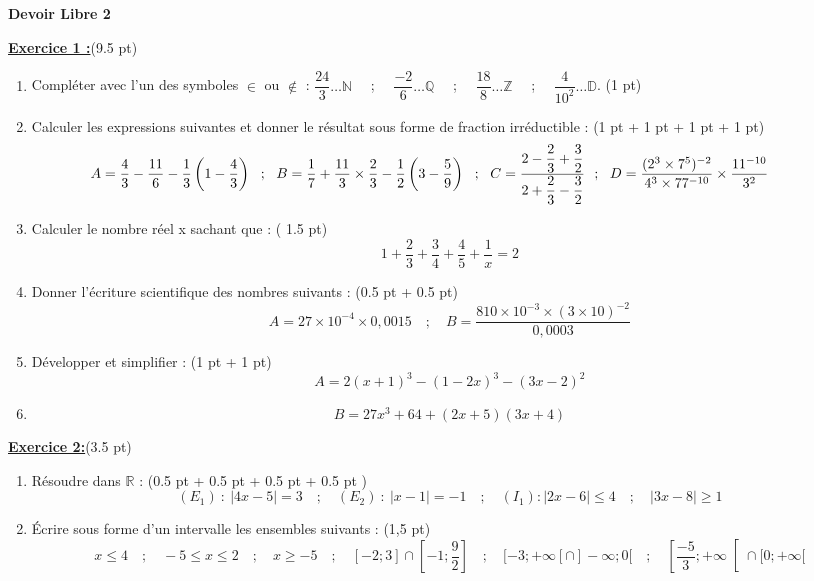 \documentclass[12pt,a4paper]{article}
\begin{document}
\pagestyle{fancy}
\fancyhf{} %
\fancyfoot[C]{\thepage} %


\begin{center}
    \textbf{\Large  Devoir Libre 2}
\end{center}

\underline{\large\textbf{Exercice 1 :}}(9.5 pt)
\begin{enumerate}
   \item Compléter avec l'un des symboles $\in$ ou $\not\in$ : $\dfrac{24}{3}\dots \mathbb{N}$ \ \ ; \ \ $\dfrac{-2}{6}\dots \mathbb{Q}$ \ \ ; \ \ $\dfrac{18}{8}\dots \mathbb{Z}$ \ \ ; \ \ $\dfrac{4}{10^2}\dots \mathbb{D}$. (1 pt)
   \item Calculer les expressions suivantes et donner le résultat sous forme de fraction irréductible : (1 pt + 1 pt + 1 pt + 1 pt)
   $$\hspace{-10mm} A = \dfrac{4}{3} - \dfrac{11}{6} - \dfrac{1}{3}\left(1 - \dfrac{4}{3}\right) \ \ ; \ \ B = \dfrac{1}{7} + \dfrac{11}{3}\times\dfrac{2}{3} - \dfrac{1}{2}\left(3 - \dfrac{5}{9} \right) \ \ ; \ \ C = \dfrac{2 - \dfrac{2}{3} + \dfrac{3}{2}}{2 + \dfrac{2}{3} - \dfrac{3}{2}}\ \ ; \ \ D = \dfrac{(2^3\times 7^5)^{-2}}{4^3\times 77^{-10}}\times\dfrac{11^{-10}}{3^2}$$
   \item Calculer le nombre réel x sachant que : ( 1.5 pt)
   $$1 + \dfrac{2}{3} + \dfrac{3}{4} + \dfrac{4}{5} + \dfrac{1}{x} = 2$$
   \item Donner l’écriture scientifique des nombres suivants : (0.5 pt + 0.5 pt)
   $$A = 27\times 10^{-4}\times 0,0015 \quad ; \quad B = \dfrac{810\times 10^{-3} \times (3\times 10)^{-2}}{0,0003}$$
   \item Développer et simplifier : (1 pt + 1 pt)
   $$A = 2(x + 1)^3 - (1 - 2x)^3 - (3x - 2)^2$$
   \item $$B = 27x^3 + 64 + (2x + 5)(3x + 4)$$
   
\end{enumerate}

\underline{\large\textbf{Exercice  2:}}(3.5 pt)
\begin{enumerate}
	\item Résoudre dans $\mathbb{R}$ : (0.5 pt + 0.5 pt + 0.5 pt  + 0.5 pt )
		$$(E_1) \ : \ |4x - 5| = 3 \quad ; \quad (E_2) \ : \ |x - 1| = -1 \quad;\quad (I_1) : |2x - 6| \leq 4 \quad;\quad |3x - 8| \geq 1$$
	\item Écrire sous forme d’un intervalle les ensembles suivants : (1,5 pt)
	$$x\leq 4 \quad;\quad -5\leq x\leq 2 \quad;\quad x \geq -5 \quad;\quad [-2;3]\cap \left[-1;\dfrac{9}{2}\right]\quad;\quad [-3;+\infty[\cap]-\infty;0[\quad;\quad \left[\dfrac{-5}{3};+\infty\right[\cap [0;+\infty[$$
\end{enumerate}
\end{document}
